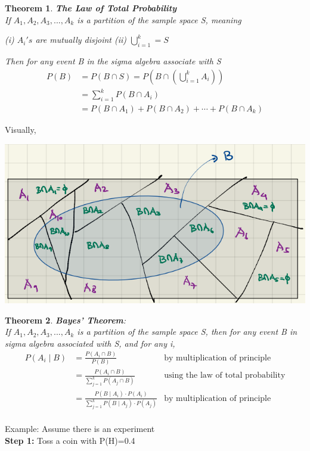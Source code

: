 \documentclass[11pt,oneside]{book}
\theoremstyle{break}
\theoremstyle{break}
\newtheorem{thm}{Theorem}[section]
\newcommand{\example}{\color{WildStrawberry}Example: \color{black}}
\begin{document}
\begin{thm}
\textbf{The Law of Total Probability} \\
If $A_1,A_2, A_3,...,A_k$ is a partition of the sample space S, meaning
\begin{center} 
(i) $A_i's$ are mutually disjoint (ii) $\bigcup_{i=1}^{k}=S$
\end{center}
Then for any event B in the sigma algebra associate with S\begin{align*}
P(B)&=P(B\cap S)=P\left(B\cap \left(\bigcup_{i=1}^{k}A_i\right)\right)\\
&=\sum_{i=1}^{k}P(B\cap A_i)\\
&=P(B\cap A_1)+P(B\cap A_2)+\cdots +P(B\cap A_k)
\end{align*}
\end{thm}
Visually, \begin{center}
\includegraphics[scale=0.9]{figures/visual_total_law}
\end{center}
\begin{thm}
\textbf{Bayes' Theorem}: \\
If $A_1,A_2, A_3,...,A_k$ is a partition of the sample space S, then for any event B in sigma algebra associated with S, and for any i, \begin{align*}
P(A_i\mid B)&=\frac{P(A_i\cap B)}{P(B)} &\text{by multiplication of principle}\\
&=\frac{P(A_i\cap B)}{\sum_{j=1}^{k}P(A_j\cap B)} &\text{using the law of total probability}\\
&=\frac{P(B\mid A_i)\cdot P(A_i)}{\sum_{j=1}^{k}P(B\mid A_j)\cdot P(A_j)} &\text{by multiplication of principle}\\
\end{align*}
\end{thm}
\example Assume there is an experiment\\
\text{\qquad} \textbf{Step 1:} Toss a coin with P(H)=0.4\\
\end{document}

